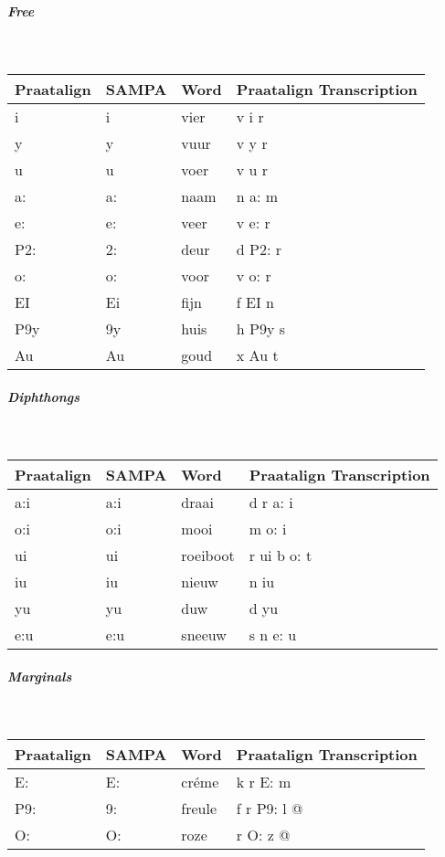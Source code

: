 \subparagraph{Free}\strut\\
\begin{tabular}{llll}
	Praatalign & SAMPA & Word & Praatalign Transcription\\
	\hline
	i & i & vier & v i r\\
	y & y & vuur & v y r\\
	u & u & voer & v u r\\
	a: & a: & naam & n a: m\\
	e: & e: & veer & v e: r\\
	P2: & 2: & deur & d P2: r\\
	o: & o: & voor & v o: r\\
	EI & Ei & fijn & f EI n\\
	P9y & 9y & huis & h P9y s\\
	Au & Au & goud & x Au t
\end{tabular}

\subparagraph{Diphthongs}\strut\\
\begin{tabular}{llll}
	Praatalign & SAMPA & Word & Praatalign Transcription\\
	\hline
	a:i & a:i & draai & d r a: i\\
	o:i & o:i & mooi & m o: i\\
	ui & ui & roeiboot & r ui b o: t\\
	iu & iu & nieuw & n iu\\
	yu & yu & duw & d yu\\
	e:u & e:u & sneeuw & s n e: u
\end{tabular}

\subparagraph{Marginals}\strut\\
\begin{tabular}{llll}
	Praatalign & SAMPA & Word & Praatalign Transcription\\
	\hline
	E: & E: & cr\'eme & k r E: m\\
	P9: & 9: & freule & f r P9: l @\\
	O: & O: & roze & r O: z @
\end{tabular}

\newpage
